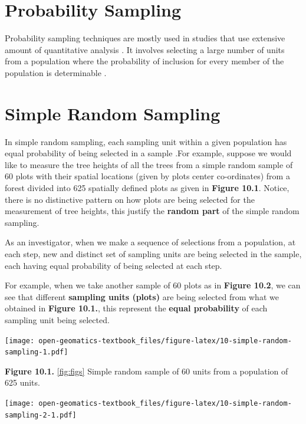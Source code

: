 \documentclass[
]{book}
\begin{document}
\hypertarget{probability-sampling}{%
\section{Probability Sampling}\label{probability-sampling}}

Probability sampling techniques are mostly used in studies that use extensive amount of quantitative analysis \citep{Tashakkori2010}. It involves selecting a large number of units from a population where the probability of inclusion for every member of the population is determinable \citep{Tashakkori2010}.

\hypertarget{simple-random-sampling}{%
\section{Simple Random Sampling}\label{simple-random-sampling}}

In simple random sampling, each sampling unit within a given population has equal probability of being selected in a sample \citep{thompson2012sampling}.For example, suppose we would like to measure the tree heights of all the trees from a simple random sample of 60 plots with their spatial locations (given by plots center co-ordinates) from a forest divided into 625 spatially defined plots as given in \textbf{Figure 10.1}. Notice, there is no distinctive pattern on how plots are being selected for the measurement of tree heights, this justify the \textbf{random part} of the simple random sampling.

As an investigator, when we make a sequence of selections from a population, at each step, new and distinct set of sampling units are being selected in the sample, each having equal probability of being selected at each step.

For example, when we take another sample of 60 plots as in \textbf{Figure 10.2}, we can see that different \textbf{sampling units (plots)} are being selected from what we obtained in \textbf{Figure 10.1.}, this represent the \textbf{equal probability} of each sampling unit being selected.

\texttt{[image: open-geomatics-textbook\_files/figure-latex/10-simple-random-sampling-1.pdf]}

\textbf{Figure 10.1.} \ref{fig:figs} Simple random sample of 60 units from a population of 625 units.

\texttt{[image: open-geomatics-textbook\_files/figure-latex/10-simple-random-sampling-2-1.pdf]}
\end{document}
